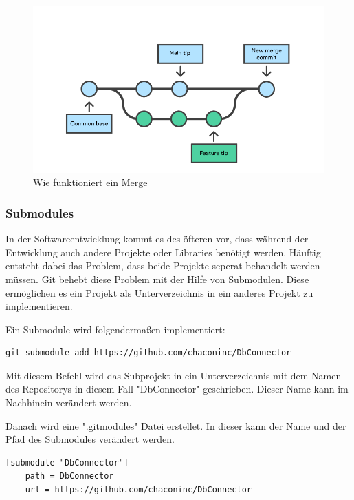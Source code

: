\begin{figure}[h!]
    \centering
    \includegraphics[width=0.6\linewidth]{pics/merge.png}
    \caption{Wie funktioniert ein Merge}
    \label{fig:enter-label}
\end{figure}


\subsubsection{Submodules}

In der Softwareentwicklung kommt es des öfteren vor, dass während der Entwicklung auch andere Projekte oder Libraries benötigt werden. Häuftig entsteht dabei das Problem, dass beide Projekte seperat behandelt werden müssen. Git behebt diese Problem mit der Hilfe von Submodulen. Diese ermöglichen es ein Projekt als Unterverzeichnis in ein anderes Projekt zu implementieren.

Ein Submodule wird folgendermaßen implementiert:

\begin{lstlisting}
git submodule add https://github.com/chaconinc/DbConnector
\end{lstlisting}

Mit diesem Befehl wird das Subprojekt in ein Unterverzeichnis mit dem Namen des Repositorys in diesem Fall "DbConnector" geschrieben. Dieser Name kann im Nachhinein verändert werden.

Danach wird eine ".gitmodules" Datei erstellet. In dieser kann der Name und der Pfad des Submodules verändert werden.
\begin{lstlisting}
[submodule "DbConnector"]
	path = DbConnector
	url = https://github.com/chaconinc/DbConnector
\end{lstlisting}

